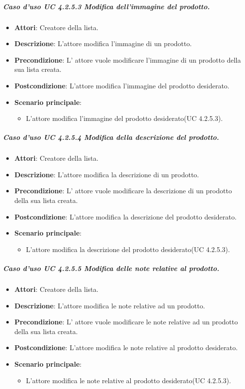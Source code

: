 	\subparagraph{Caso d'uso UC 4.2.5.3 Modifica dell'immagine del prodotto.}
	\begin{itemize}
		\item\textbf{Attori}: Creatore della lista.
		\item\textbf{Descrizione}: L'attore modifica l'immagine di un prodotto.
		\item\textbf{Precondizione}: L' attore vuole modificare l'immagine di un prodotto della sua lista creata.
		\item\textbf{Postcondizione}: L'attore modifica l'immagine del prodotto desiderato.
		\item\textbf{Scenario principale}:
			\begin{itemize}
				\item L'attore modifica l'immagine del prodotto desiderato(UC 4.2.5.3). 
			\end{itemize}
		
	\end{itemize}
	
	\subparagraph{Caso d'uso UC 4.2.5.4 Modifica della descrizione del prodotto.}
	\begin{itemize}
		\item\textbf{Attori}: Creatore della lista.
		\item\textbf{Descrizione}: L'attore modifica la descrizione di un prodotto.
		\item\textbf{Precondizione}: L' attore vuole modificare la descrizione di un prodotto della sua lista creata.
		\item\textbf{Postcondizione}: L'attore modifica la descrizione del prodotto desiderato.
		\item\textbf{Scenario principale}:
			\begin{itemize}
				\item L'attore modifica la descrizione del prodotto desiderato(UC 4.2.5.3). 
			\end{itemize}
		
	\end{itemize}
	
	\subparagraph{Caso d'uso UC 4.2.5.5 Modifica delle note relative al prodotto.}
	\begin{itemize}
		\item\textbf{Attori}: Creatore della lista.
		\item\textbf{Descrizione}: L'attore modifica le note relative ad un prodotto.
		\item\textbf{Precondizione}: L' attore vuole modificare le note relative ad un prodotto della sua lista creata.
		\item\textbf{Postcondizione}: L'attore modifica le note relative al prodotto desiderato.
		\item\textbf{Scenario principale}:
			\begin{itemize}
				\item L'attore modifica le note relative al prodotto desiderato(UC 4.2.5.3). 
			\end{itemize}
		
	\end{itemize}
	
